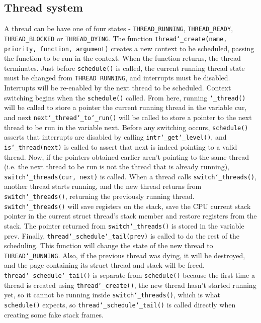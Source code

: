 \documentclass{article}
\renewcommand{\_}{\char`_}
\begin{document}
\subsection{Thread system}
A thread can be have one of four states - \texttt{THREAD_RUNNING}, \texttt{THREAD_READY}, \texttt{THREAD_BLOCKED} or \texttt{THREAD_DYING}. The function \texttt{thread\char`_create(name, priority, function, argument)} creates a new context to be scheduled, 
passing the function to be run in the context. When the function returns, the thread terminates. 
Just before \texttt{schedule()} is called, the current running thread state must be changed from 
\texttt{THREAD RUNNING}, and interrupts must be disabled. Interrupts will be re-enabled by the next 
thread to be scheduled. Context switching begins when the \texttt{schedule()} called. From here, 
running \texttt{\char`_thread()} will be called to store a pointer the current running thread in the variable cur, 
and next \texttt{next\char`_thread\char`_to\char`_run()} will be called to store a pointer to the next thread to be run in the
variable next. Before any switching occurs, \texttt{schedule()} asserts that interrupts are disabled by calling 
\texttt{intr\char`_get\char`_level()}, and \texttt{is\char`_thread(next)} is called to assert that next is indeed pointing to a valid thread. 
Now, if the pointers obtained earlier aren’t pointing to the same thread (i.e. the next thread to be run 
is not the thread that is already running), \texttt{switch\char`_threads(cur, next)} is called. When a thread calls 
\texttt{switch\char`_threads()}, another thread starts running, and the new thread returns from \texttt{switch\char`_threads()}, 
returning the previously running thread. \texttt{switch\char`_threads()} will save registers on the stack, save 
the CPU current stack pointer in the current struct thread’s stack member and restore registers 
from the stack. The pointer returned from \texttt{switch\char`_threads()} is stored in the variable prev. Finally, 
\texttt{thread\char`_schedule\char`_tail(prev)} is called to do the rest of the scheduling. This function will change the 
state of the new thread to \texttt{THREAD\char`_RUNNING}. Also, if the previous thread was dying, it will be 
destroyed, and the page containing its struct thread and stack will be freed. \texttt{thread\char`_schedule\char`_tail()}
is separate from \texttt{schedule()} because the first time a thread is created using \texttt{thread\char`_create()}, the 
new thread hasn’t started running yet, so it cannot be running inside \texttt{switch\char`_threads()}, which is what 
\texttt{schedule()} expects, so \texttt{thread\char`_schedule\char`_tail()} is called directly when creating some fake stack frames. 
\end{document}

